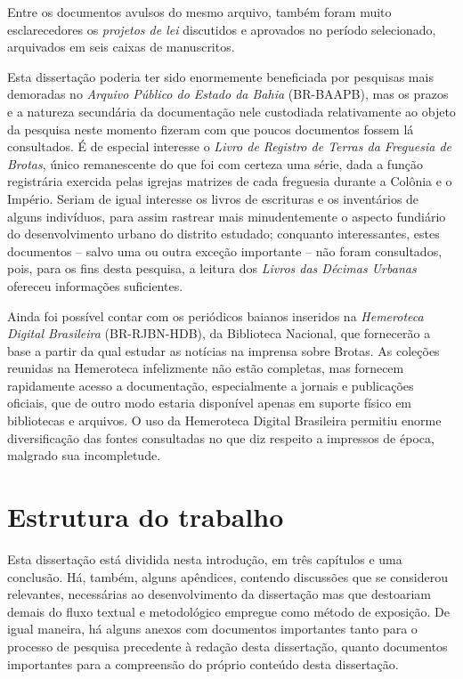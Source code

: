 Entre os documentos avulsos do mesmo arquivo, também foram muito esclarecedores os \textit{projetos de lei} discutidos e aprovados no período selecionado, arquivados em seis caixas de manuscritos.

Esta dissertação poderia ter sido enormemente beneficiada por pesquisas mais demoradas no \textit{Arquivo Público do Estado da Bahia} (BR-BAAPB), mas os prazos e a natureza secundária da documentação nele custodiada relativamente ao objeto da pesquisa neste momento fizeram com que poucos documentos fossem lá consultados. É de especial interesse o \textit{Livro de Registro de Terras da Freguesia de Brotas}, único remanescente do que foi com certeza uma série, dada a função registrária exercida pelas igrejas matrizes de cada freguesia durante a Colônia e o Império. Seriam de igual interesse os livros de escrituras e os inventários de alguns indivíduos, para assim rastrear mais minudentemente o aspecto fundiário do desenvolvimento urbano do distrito estudado; conquanto interessantes, estes documentos -- salvo uma ou outra exceção importante -- não foram consultados, pois, para os fins desta pesquisa, a leitura dos \textit{Livros das Décimas Urbanas} ofereceu informações suficientes.

Ainda foi possível contar com os periódicos baianos inseridos na \textit{Hemeroteca Digital Brasileira} (BR-RJBN-HDB), da Biblioteca Nacional, que fornecerão a base a partir da qual estudar as notícias na imprensa sobre Brotas. As coleções reunidas na Hemeroteca infelizmente não estão completas, mas fornecem rapidamente acesso a documentação, especialmente a jornais e publicações oficiais, que de outro modo estaria disponível apenas em suporte físico em bibliotecas e arquivos. O uso da Hemeroteca Digital Brasileira permitiu enorme diversificação das fontes consultadas no que diz respeito a impressos de época, malgrado sua incompletude.

\section{Estrutura do trabalho}\label{sec:estrutrab}

Esta dissertação está dividida nesta introdução, em três capítulos e uma conclusão. Há, também, alguns apêndices, contendo discussões que se considerou relevantes, necessárias ao desenvolvimento da dissertação mas que destoariam demais do fluxo textual e metodológico empregue como método de exposição. De igual maneira, há alguns anexos com documentos importantes tanto para o processo de pesquisa precedente à redação desta dissertação, quanto documentos importantes para a compreensão do próprio conteúdo desta dissertação.

